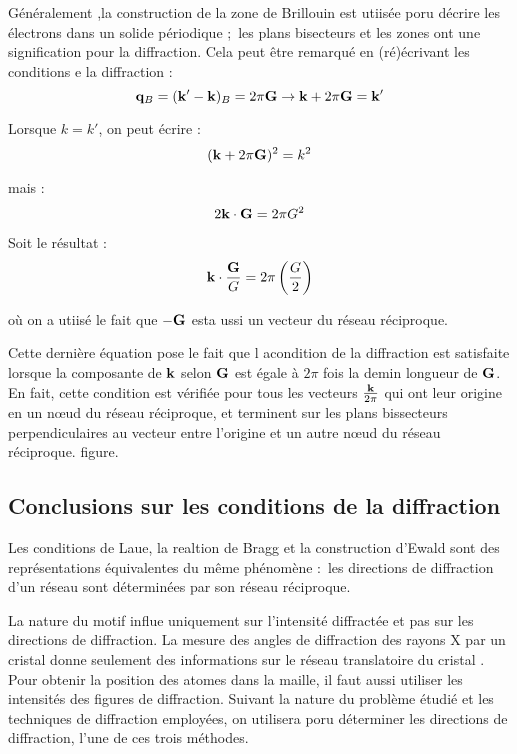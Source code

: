 Généralement ,la construction de la zone de Brillouin est utiisée poru décrire
les électrons dans un solide périodique ; les plans bisecteurs et les
zones ont une signification pour la diffraction. Cela peut être remarqué en
(ré)écrivant les conditions e la diffraction :
\begin{equation}
    \mathbf{q}_B = (\mathbf{k'-k})_B = 2\pi\mathbf{G} \rightarrow \mathbf{k} + 2\pi \mathbf{G} = \mathbf{k'}
\end{equation}

Lorsque $k=k'$, on peut écrire :
\begin{equation}
    (\mathbf{k} + 2\pi \mathbf{G})^2 = k^2
\end{equation}

mais :
\begin{equation}
    2 \mathbf{k\cdot G} = 2\pi G^2
\end{equation}

Soit le résultat :
\begin{equation}
    \mathbf{k}\cdot\frac{\mathbf{G}}{G} = 2\pi \left( \frac{G}{2} \right)
\end{equation}

où on a utiisé le fait que $-\mathbf{G}$ esta ussi un vecteur du réseau
réciproque.

Cette dernière équation pose le fait que l acondition de la diffraction est
satisfaite lorsque la composante de $\mathbf{k}$ selon $\mathbf{G}$ est égale à
$2\pi$ fois la demin longueur de $\mathbf{G}$. En fait, cette condition est
vérifiée pour tous les vecteurs $\frac{\mathbf{k}}{2\pi}$ qui ont leur origine
en un nœud du réseau réciproque, et terminent sur les plans bissecteurs
perpendiculaires au vecteur entre l'origine et un autre nœud du réseau réciproque. \TODO figure.



\subsection{Conclusions sur les conditions de la diffraction}

Les conditions de Laue, la realtion de Bragg et la construction d'Ewald sont des
représentations équivalentes du même phénomène : les directions de diffraction
d'un réseau sont déterminées par son réseau réciproque.

La nature du motif influe uniquement sur l'intensité diffractée et pas sur les
directions de diffraction. La mesure des angles de diffraction des rayons X par
un cristal donne seulement des informations sur le réseau translatoire du cristal
. Pour obtenir la position des atomes dans la maille, il faut aussi utiliser les
intensités des figures de diffraction. Suivant la nature du problème étudié et
les techniques de diffraction employées, on utilisera poru déterminer les
directions de diffraction, l'une de ces trois méthodes.

